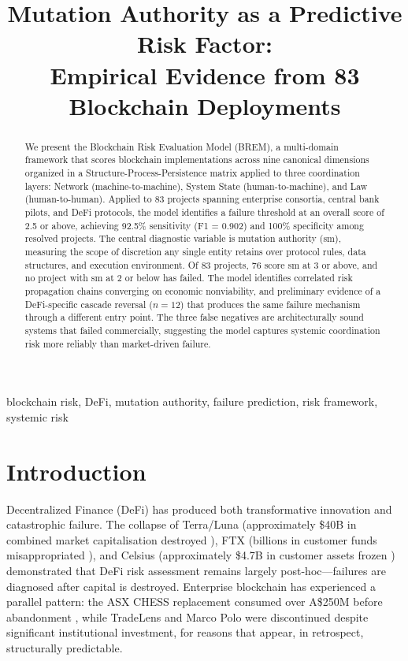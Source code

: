 \documentclass[conference]{IEEEtran}
\begin{document}
\title{Mutation Authority as a Predictive Risk Factor:\\Empirical Evidence from 83 Blockchain Deployments}

\author{
}

\maketitle

\begin{abstract}
We present the Blockchain Risk Evaluation Model (BREM), a multi-domain framework that scores blockchain implementations across nine canonical dimensions organized in a Structure-Process-Persistence matrix applied to three coordination layers: Network (machine-to-machine), System State (human-to-machine), and Law (human-to-human). Applied to 83 projects spanning enterprise consortia, central bank pilots, and DeFi protocols, the model identifies a failure threshold at an overall score of 2.5 or above, achieving 92.5\% sensitivity (F1 = 0.902) and 100\% specificity among resolved projects. The central diagnostic variable is mutation authority (sm), measuring the scope of discretion any single entity retains over protocol rules, data structures, and execution environment. Of 83 projects, 76 score sm at 3 or above, and no project with sm at 2 or below has failed. The model identifies correlated risk propagation chains converging on economic nonviability, and preliminary evidence of a DeFi-specific cascade reversal ($n=12$) that produces the same failure mechanism through a different entry point. The three false negatives are architecturally sound systems that failed commercially, suggesting the model captures systemic coordination risk more reliably than market-driven failure.
\end{abstract}

\begin{IEEEkeywords}
blockchain risk, DeFi, mutation authority, failure prediction, risk framework, systemic risk
\end{IEEEkeywords}

\section{Introduction}

Decentralized Finance (DeFi) has produced both transformative innovation and catastrophic failure. The collapse of Terra/Luna (approximately \$40B in combined market capitalisation destroyed \cite{liu2023terra}), FTX (billions in customer funds misappropriated \cite{ray2022}), and Celsius (approximately \$4.7B in customer assets frozen \cite{celsius2022}) demonstrated that DeFi risk assessment remains largely post-hoc---failures are diagnosed after capital is destroyed. Enterprise blockchain has experienced a parallel pattern: the ASX CHESS replacement consumed over A\$250M before abandonment \cite{asx2022}, while TradeLens and Marco Polo were discontinued despite significant institutional investment, for reasons that appear, in retrospect, structurally predictable.
\end{document}

